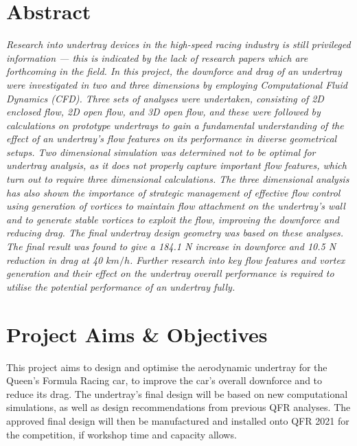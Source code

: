 \newpage
\thispagestyle{empty}
\section*{Abstract} 
\justifying

\textit{Research into undertray devices in the high-speed racing industry is still privileged information --- this is indicated by the lack of research papers which are forthcoming in the field. In this project, the downforce and drag of an undertray were investigated in two and three dimensions by employing Computational Fluid Dynamics (CFD). Three sets of analyses were undertaken, consisting of 2D enclosed flow, 2D open flow, and 3D open flow, and these were followed by calculations on prototype undertrays to gain a fundamental understanding of the effect of an undertray's flow features on its performance in diverse geometrical setups. Two dimensional simulation was determined not to be optimal for undertray analysis, as it does not properly capture important flow features, which turn out to require three dimensional calculations. The three dimensional analysis has also shown the importance of strategic management of effective flow control using generation of vortices to maintain flow attachment on the undertray's wall and to generate stable vortices to exploit the flow, improving the downforce and reducing drag. The final undertray design geometry was based on these analyses. The final result was found to give a 184.1 N increase in downforce and 10.5 N reduction in drag at 40 $km/h$. Further research into key flow features and vortex generation and their effect on the undertray overall performance is required to utilise the potential performance of an undertray fully.}


\section*{Project Aims \& Objectives}
This project aims to design and optimise the aerodynamic undertray for the Queen's Formula Racing car, to improve the car's overall downforce and to reduce its drag. The undertray's final design will be based on new computational simulations, as well as design recommendations from previous QFR analyses. The approved final design will then be manufactured and installed onto QFR 2021 for the competition, if workshop time and capacity allows.

